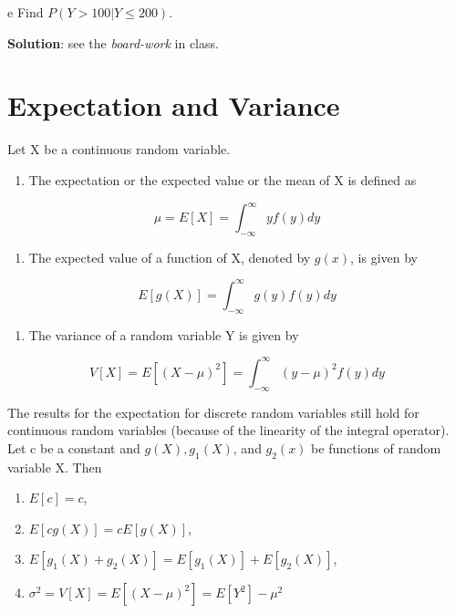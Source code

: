 \documentclass[
]{book}
\providecommand{\tightlist}{%
  \setlength{\itemsep}{0pt}\setlength{\parskip}{0pt}}
\begin{document}
e Find \(P (Y > 100|Y \le 200)\).

\textbf{Solution}: see the \emph{board-work} in class.

\hfill\break

\hypertarget{expectation-and-variance-1}{%
\section{Expectation and Variance}\label{expectation-and-variance-1}}

Let X be a continuous random variable.

\begin{enumerate}
\def\labelenumi{\arabic{enumi}.}
\tightlist
\item
  The expectation or the expected value or the mean of X is defined as
\end{enumerate}

\[
\mu = E[X] = \int_{-\infty}^\infty yf(y)dy
\]

\begin{enumerate}
\def\labelenumi{\arabic{enumi}.}
\setcounter{enumi}{1}
\tightlist
\item
  The expected value of a function of X, denoted by \(g(x)\), is given by
\end{enumerate}

\[
E[g(X)] = \int_{-\infty}^\infty g(y)f(y)dy
\]

\begin{enumerate}
\def\labelenumi{\arabic{enumi}.}
\setcounter{enumi}{2}
\tightlist
\item
  The variance of a random variable Y is given by
\end{enumerate}

\[
 V[X] = E[(X-\mu)^2] = \int_{-\infty}^\infty (y-\mu)^2f(y)dy
 \]

The results for the expectation for discrete random variables still hold for continuous random variables (because of the linearity of the integral operator). Let c be a constant and \(g(X), g_1(X)\), and \(g_2(x)\) be functions of random variable X. Then

\begin{enumerate}
\def\labelenumi{\arabic{enumi}.}
\item
  \(E[c] = c\),
\item
  \(E[cg(X)] = c E[g(X)]\),
\item
  \(E[g_1(X) + g_2(X)] = E[g_1(X)] + E[g_2(X)]\),
\item
  \(\sigma^2 = V[X] = E[(X-\mu)^2] = E[Y^2] - \mu^2\)
\end{enumerate}
\end{document}
